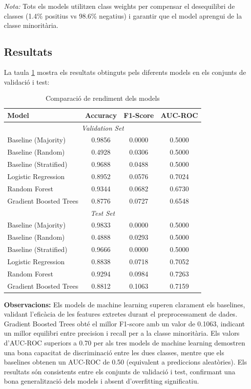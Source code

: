 \documentclass[12pt, a4paper]{article}
\begin{document}
\textit{Nota:} Tots els models utilitzen class weights per compensar el desequilibri de classes (1.4\% positius vs 98.6\% negatius) i garantir que el model aprengui de la classe minoritària.

\subsection{Resultats}

La taula \ref{tab:model_comparison} mostra els resultats obtinguts pels diferents models en els conjunts de validació i test:

\begin{table}[H]
\centering
\caption{Comparació de rendiment dels models}
\label{tab:model_comparison}
\small
\begin{tabular}{lccc}
\toprule
\textbf{Model} & \textbf{Accuracy} & \textbf{F1-Score} & \textbf{AUC-ROC} \\
\midrule
\multicolumn{4}{c}{\textit{Validation Set}} \\
\midrule
Baseline (Majority) & 0.9856 & 0.0000 & 0.5000 \\
Baseline (Random) & 0.4928 & 0.0306 & 0.5000 \\
Baseline (Stratified) & 0.9688 & 0.0488 & 0.5000 \\
Logistic Regression & 0.8952 & 0.0576 & 0.7024 \\
Random Forest & 0.9344 & 0.0682 & 0.6730 \\
Gradient Boosted Trees & 0.8776 & 0.0727 & 0.6548 \\
\midrule
\multicolumn{4}{c}{\textit{Test Set}} \\
\midrule
Baseline (Majority) & 0.9833 & 0.0000 & 0.5000 \\
Baseline (Random) & 0.4888 & 0.0293 & 0.5000 \\
Baseline (Stratified) & 0.9666 & 0.0000 & 0.5000 \\
Logistic Regression & 0.8838 & 0.0718 & 0.7052 \\
Random Forest & 0.9294 & 0.0984 & 0.7263 \\
Gradient Boosted Trees & 0.8812 & 0.1063 & 0.7159 \\
\bottomrule
\end{tabular}
\end{table}

\textbf{Observacions:}
Els models de machine learning superen clarament els baselines, validant l'eficàcia de les features extretes durant el preprocessament de dades. Gradient Boosted Trees obté el millor F1-score amb un valor de 0.1063, indicant un millor equilibri entre precision i recall per a la classe minoritària. Els valors d'AUC-ROC superiors a 0.70 per als tres models de machine learning demostren una bona capacitat de discriminació entre les dues classes, mentre que els baselines obtenen un AUC-ROC de 0.50 (equivalent a prediccions aleatòries). Els resultats són consistents entre els conjunts de validació i test, confirmant una bona generalització dels models i absent d'overfitting significatiu.
\end{document}
